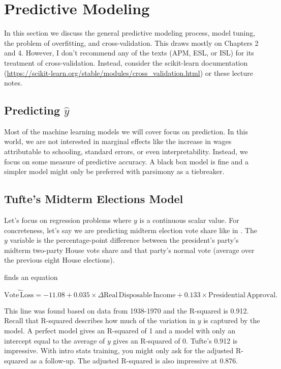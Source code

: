 \section{Predictive Modeling}

In this section we discuss the general predictive modeling process, model tuning, the problem of overfitting, and cross-validation. This draws mostly on \cite{kuhn2013applied} Chapters 2 and 4. However, I don't recommend any of the texts (APM, ESL, or ISL) for its treatment of cross-validation. Instead, consider the scikit-learn documentation (\url{https://scikit-learn.org/stable/modules/cross_validation.html}) or these lecture notes.

\subsection{Predicting $\hat{y}$}

Most of the machine learning models we will cover focus on prediction. In this world, we are not interested in marginal effects like the increase in wages attributable to schooling, standard errors, or even interpretability. Instead, we focus on some measure of predictive accuracy. A black box model is fine and a simpler model might only be preferred with parsimony as a tiebreaker.

\subsection{Tufte's Midterm Elections Model}

Let's focus on regression problems where $y$ is a continuous scalar value. For concreteness, let's say we are predicting midterm election vote share like in \cite{tufte1975determinants}. The $y$ variable is the percentage-point difference between the president's party's midterm two-party House vote share and that party's normal vote (average over the previous eight House elections).

\cite{tufte1975determinants} finds an equation 

$$\widehat{\mathrm{Vote\,Loss}} = -11.08 + 0.035\times \Delta\mathrm{Real\,Disposable\,Income} + 0.133\times \mathrm{Presidential\,Approval}.$$

This line was found based on data from 1938-1970 and the R-squared is 0.912. Recall that R-squared describes how much of the variation in $y$ is captured by the model. A perfect model gives an R-squared of 1 and a model with only an intercept equal to the average of $y$ gives an R-squared of 0. Tufte's 0.912 is impressive. With intro stats training, you might only ask for the adjusted R-squared as a follow-up. The adjusted R-squared is also impressive at 0.876.

